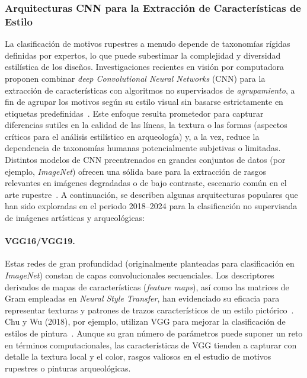 \subsubsection{Arquitecturas CNN para la Extracción de Características de Estilo }
La clasificación de motivos rupestres a menudo depende de taxonomías rígidas definidas por expertos, lo que puede subestimar la complejidad y diversidad estilística de los diseños.
Investigaciones recientes en visión por computadora proponen combinar \textit{deep Convolutional Neural Networks} (CNN) para la extracción de características con algoritmos no supervisados de \textit{agrupamiento}, a fin de agrupar los motivos según su estilo visual sin basarse estrictamente en etiquetas predefinidas~\cite{gairola2020}.
Este enfoque resulta prometedor para capturar diferencias sutiles en la calidad de las líneas, la textura o las formas (aspectos críticos para el análisis estilístico en arqueología) y, a la vez, reduce la dependencia de taxonomías humanas potencialmente subjetivas o limitadas.
Distintos modelos de CNN preentrenados en grandes conjuntos de datos (por ejemplo, \textit{ImageNet}) ofrecen una sólida base para la extracción de rasgos relevantes en imágenes degradadas o de bajo contraste, escenario común en el arte rupestre~\cite{guerin2018}.
A continuación, se describen algunas arquitecturas populares que han sido exploradas en el periodo 2018–2024 para la clasificación no supervisada de imágenes artísticas y arqueológicas:

\paragraph{VGG16/VGG19.}
Estas redes de gran profundidad (originalmente planteadas para clasificación en \textit{ImageNet}) constan de capas convolucionales secuenciales.
Los descriptores derivados de mapas de características (\textit{feature maps}), así como las matrices de Gram empleadas en \textit{Neural Style Transfer}, han evidenciado su eficacia para representar texturas y patrones de trazos característicos de un estilo pictórico~\cite{gairola2020}.
Chu y Wu (2018), por ejemplo, utilizan VGG para mejorar la clasificación de estilos de pintura~\cite{gairola2020}.
Aunque su gran número de parámetros puede suponer un reto en términos computacionales, las características de VGG tienden a capturar con detalle la textura local y el color, rasgos valiosos en el estudio de motivos rupestres o pinturas arqueológicas.

